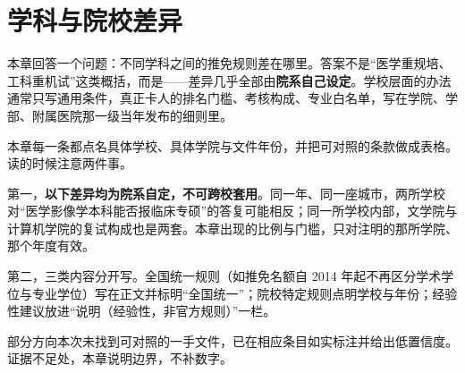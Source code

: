 \chapter{学科与院校差异}
\label{ch20}
\begin{keybox}
本章回答一个问题：不同学科之间的推免规则差在哪里。答案不是“医学重规培、工科重机试”这类概括，而是——差异几乎全部由\textbf{院系自己设定}。学校层面的办法通常只写通用条件，真正卡人的排名门槛、考核构成、专业白名单，写在学院、学部、附属医院那一级当年发布的细则里。

本章每一条都点名具体学校、具体学院与文件年份，并把可对照的条款做成表格。读的时候注意两件事。

第一，\textbf{以下差异均为院系自定，不可跨校套用}。同一年、同一座城市，两所学校对“医学影像学本科能否报临床专硕”的答复可能相反；同一所学校内部，文学院与计算机学院的复试构成也是两套。本章出现的比例与门槛，只对注明的那所学院、那个年度有效。

第二，三类内容分开写。全国统一规则（如推免名额自 2014 年起不再区分学术学位与专业学位）写在正文并标明“全国统一”；院校特定规则点明学校与年份；经验性建议放进“说明（经验性，非官方规则）”一栏。

部分方向本次未找到可对照的一手文件，已在相应条目如实标注并给出低置信度。证据不足处，本章说明边界，不补数字。
\end{keybox}

